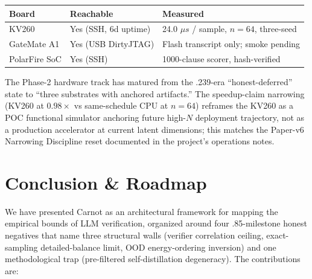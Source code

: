 \documentclass[10pt]{article}
\begin{document}
\begin{center}
\begin{tabular}{lll}
\toprule
Board & Reachable & Measured \\
\midrule
KV260 & Yes (SSH, 6d uptime) & 24.0 $\mu s$ / sample, $n=64$, three-seed \\
GateMate A1 & Yes (USB DirtyJTAG) & Flash transcript only; smoke pending \\
PolarFire SoC & Yes (SSH) & 1000-clause scorer, hash-verified \\
\bottomrule
\end{tabular}
\end{center}

The Phase-2 hardware track has matured from the .239-era
``honest-deferred'' state to ``three substrates with anchored
artifacts.'' The speedup-claim narrowing (KV260 at $0.98\times$ vs
same-schedule CPU at $n=64$) reframes the KV260 as a POC functional
simulator anchoring future high-$N$ deployment trajectory, not as a
production accelerator at current latent dimensions; this matches
the Paper-v6 Narrowing Discipline reset documented in the project's
operations notes.

\section{Conclusion \& Roadmap}
\label{sec:roadmap}
\label{sec:conclusion}

We have presented Carnot as an architectural framework for mapping
the empirical bounds of LLM verification, organized around four
.85-milestone honest negatives that name three structural walls
(verifier correlation ceiling, exact-sampling detailed-balance
limit, OOD energy-ordering inversion) and one methodological trap
(pre-filtered self-distillation degeneracy). The contributions are:
\end{document}
